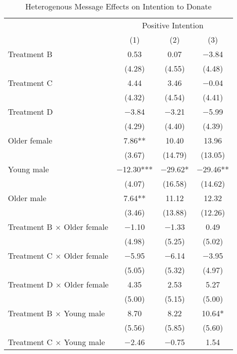 \documentclass[12pt, a4paper]{article}
\begin{document}
\begin{table}[H]

\caption{\label{tab:int-lm-interaction-reg}Heterogenous Message Effects on Intention to Donate}
\centering
\fontsize{8}{10}\selectfont
\begin{threeparttable}
\begin{tabular}[t]{lccc}
\toprule
\multicolumn{1}{c}{ } & \multicolumn{3}{c}{Positive Intention} \\
\cmidrule(l{3pt}r{3pt}){2-4}
  & (1) & (2) & (3)\\
\midrule
Treatment B & \num{0.53} & \num{0.07} & \num{-3.84}\\
 & (\num{4.28}) & (\num{4.55}) & (\num{4.48})\\
Treatment C & \num{4.44} & \num{3.46} & \num{-0.04}\\
 & (\num{4.32}) & (\num{4.54}) & (\num{4.41})\\
Treatment D & \num{-3.84} & \num{-3.21} & \num{-5.99}\\
 & (\num{4.29}) & (\num{4.40}) & (\num{4.39})\\
Older female & \num{7.86}** & \num{10.40} & \num{13.96}\\
 & (\num{3.67}) & (\num{14.79}) & (\num{13.05})\\
Young male & \num{-12.30}*** & \num{-29.62}* & \num{-29.46}**\\
 & (\num{4.07}) & (\num{16.58}) & (\num{14.62})\\
Older male & \num{7.64}** & \num{11.12} & \num{12.32}\\
 & (\num{3.46}) & (\num{13.88}) & (\num{12.26})\\
Treatment B $\times$ Older female & \num{-1.10} & \num{-1.33} & \num{0.49}\\
 & (\num{4.98}) & (\num{5.25}) & (\num{5.02})\\
Treatment C $\times$ Older female & \num{-5.95} & \num{-6.14} & \num{-3.95}\\
 & (\num{5.05}) & (\num{5.32}) & (\num{4.97})\\
Treatment D $\times$ Older female & \num{4.35} & \num{2.53} & \num{5.27}\\
 & (\num{5.00}) & (\num{5.15}) & (\num{5.00})\\
Treatment B $\times$ Young male & \num{8.70} & \num{8.22} & \num{10.64}*\\
 & (\num{5.56}) & (\num{5.85}) & (\num{5.60})\\
Treatment C $\times$ Young male & \num{-2.46} & \num{-0.75} & \num{1.54}\\

\end{tabular}
\end{threeparttable}
\end{table}
\end{document}
